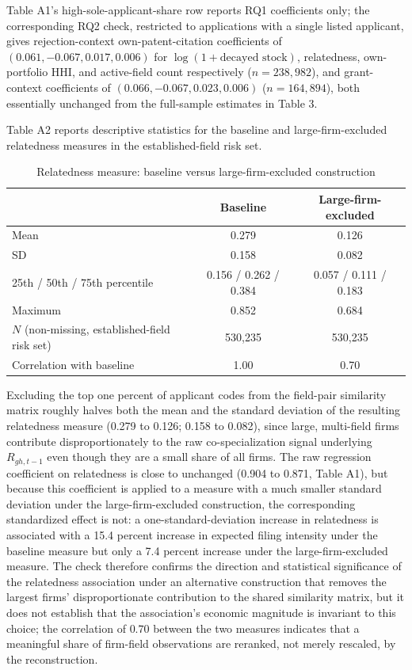 \documentclass[12pt]{article}
\begin{document}
Table A1's high-sole-applicant-share row reports RQ1 coefficients only; the corresponding RQ2 check, restricted to applications with a single listed applicant, gives rejection-context own-patent-citation coefficients of $(0.061, -0.067, 0.017, 0.006)$ for $\log(1+\text{decayed stock})$, relatedness, own-portfolio HHI, and active-field count respectively ($n=238{,}982$), and grant-context coefficients of $(0.066, -0.067, 0.023, 0.006)$ ($n=164{,}894$), both essentially unchanged from the full-sample estimates in Table 3.

Table A2 reports descriptive statistics for the baseline and large-firm-excluded relatedness measures in the established-field risk set.

\begin{table}[htbp]
\centering
\small
\caption{Relatedness measure: baseline versus large-firm-excluded construction}
\label{tab:appendixA2}
\begin{tabular}{lcc}
\toprule
 & Baseline & Large-firm-excluded \\
\midrule
Mean & 0.279 & 0.126 \\
SD & 0.158 & 0.082 \\
25th / 50th / 75th percentile & 0.156 / 0.262 / 0.384 & 0.057 / 0.111 / 0.183 \\
Maximum & 0.852 & 0.684 \\
$N$ (non-missing, established-field risk set) & 530{,}235 & 530{,}235 \\
Correlation with baseline & 1.00 & 0.70 \\
\bottomrule
\end{tabular}
\begin{minipage}{\textwidth}
\vspace{2pt}
\footnotesize Excluding the top one percent of applicant codes from the field-pair similarity matrix roughly halves both the mean and the standard deviation of the resulting relatedness measure (0.279 to 0.126; 0.158 to 0.082), since large, multi-field firms contribute disproportionately to the raw co-specialization signal underlying $R_{gh,t-1}$ even though they are a small share of all firms. The raw regression coefficient on relatedness is close to unchanged (0.904 to 0.871, Table A1), but because this coefficient is applied to a measure with a much smaller standard deviation under the large-firm-excluded construction, the corresponding standardized effect is not: a one-standard-deviation increase in relatedness is associated with a 15.4 percent increase in expected filing intensity under the baseline measure but only a 7.4 percent increase under the large-firm-excluded measure. The check therefore confirms the direction and statistical significance of the relatedness association under an alternative construction that removes the largest firms' disproportionate contribution to the shared similarity matrix, but it does not establish that the association's economic magnitude is invariant to this choice; the correlation of $0.70$ between the two measures indicates that a meaningful share of firm-field observations are reranked, not merely rescaled, by the reconstruction.
\end{minipage}
\end{table}
\end{document}
